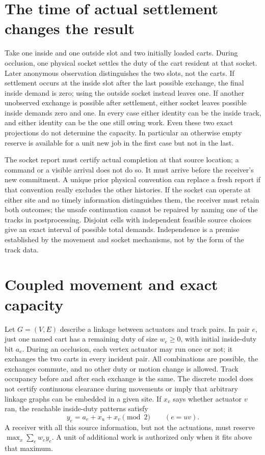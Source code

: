 \documentclass[11pt]{article}
\begin{document}
\section{The time of actual settlement changes the result}

Take one inside and one outside slot and two initially loaded carts. During
occlusion, one physical socket settles the duty of the cart resident at that
socket. Later anonymous observation distinguishes the two slots, not the
carts. If settlement occurs at the inside slot after the last possible
exchange, the final inside demand is zero; using the outside socket instead
leaves one. If another unobserved exchange is possible after settlement,
either socket leaves possible inside demands zero and one. In every case
either identity can be the inside track, and either identity can be the
one still owing work. Even these two exact projections do not determine
the capacity. In particular an otherwise empty reserve is available for a
unit new job in the first case but not in the last.

The socket report must certify actual completion at that source location;
a command or a visible arrival does not do so. It must arrive before the
receiver's new commitment. A unique prior physical convention can replace
a fresh report if that convention really excludes the other histories. If
the socket can operate at either site and no timely information distinguishes
them, the receiver must retain both outcomes; the unsafe continuation cannot
be repaired by naming one of the tracks in postprocessing. Disjoint cells
with independent feasible source choices give an exact interval of possible
total demands. Independence is a premise established by the movement and
socket mechanisms, not by the form of the track data.

\section{Coupled movement and exact capacity}

Let \(G=(V,E)\) describe a linkage between actuators and track pairs. In pair
\(e\), just one named cart has a remaining duty of size \(w_e\geq0\), with
initial inside-duty bit \(a_e\). During an occlusion, each vertex actuator
may run once or not; it exchanges the two carts in every incident pair.
All combinations are possible, the exchanges commute, and no other
duty or motion change is allowed. Track occupancy before and after each
exchange is the same. The discrete model does not certify continuous
clearance during movements or imply that arbitrary linkage graphs can be
embedded in a given site. If \(x_v\) says whether actuator \(v\) ran, the
reachable inside-duty patterns satisfy
\[
    y_e=a_e+x_u+x_v\pmod2\qquad(e=uv).
\]
A receiver with all this source information, but not the actuations, must
reserve \(\max_x\sum_e w_e y_e\). A unit of additional work is authorized
only when it fits above that maximum.
\end{document}
